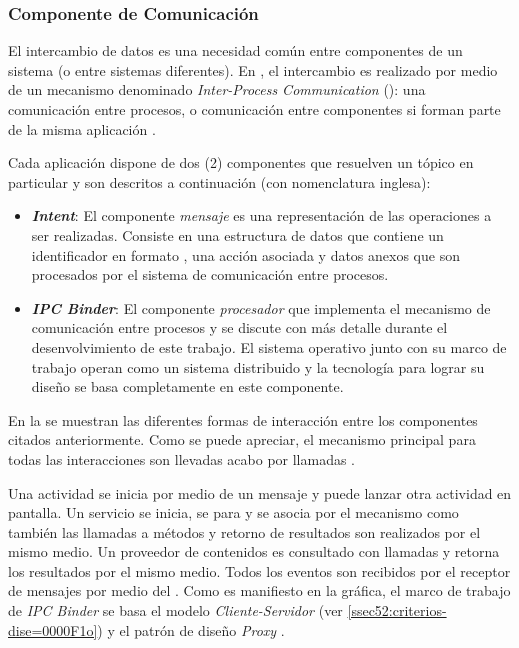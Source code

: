 \subsubsection{Componente de Comunicación}

El intercambio de datos es una necesidad común entre componentes de
un sistema (o entre sistemas diferentes). En \emph{},
el intercambio es realizado por medio de un mecanismo denominado \emph{Inter-Process
Communication} (): una comunicación entre procesos, o comunicación
entre componentes si forman parte de la misma aplicación \cite{Schreiber2011}. 

Cada aplicación dispone de dos (2) componentes que resuelven un tópico
en particular y son descritos a continuación (con nomenclatura inglesa):
\begin{itemize}
\item \textbf{\emph{Intent}}: El componente \emph{mensaje} es una representación
de las operaciones a ser realizadas. Consiste en una estructura de
datos que contiene un identificador en formato , una acción
asociada y datos anexos que son procesados por el sistema de comunicación
entre procesos. 
\item \textbf{\emph{IPC Binder}}: El componente \emph{procesador} que implementa
el mecanismo de comunicación entre procesos \emph{\cite{Schreiber2011}}
y se discute con más detalle durante el desenvolvimiento de este trabajo\emph{.
}El sistema operativo  junto con su marco de trabajo
operan como un sistema distribuido y la tecnología para lograr su
diseño se basa completamente en este componente.
\end{itemize}
En la  se muestran las diferentes formas
de interacción entre los componentes \emph{ }citados
anteriormente. Como se puede apreciar, el mecanismo principal para
todas las interacciones son llevadas acabo por llamadas .

Una actividad se inicia por medio de un mensaje y puede lanzar otra
actividad en pantalla. Un servicio se inicia, se para y se asocia
por el mecanismo  como también las llamadas a métodos y
retorno de resultados son realizados por el mismo medio. Un proveedor
de contenidos es consultado con llamadas  y retorna los
resultados por el mismo medio. Todos los eventos son recibidos por
el receptor de mensajes por medio del . Como es manifiesto
en la gráfica, el marco de trabajo de \emph{IPC Binder} se basa el
modelo \emph{Cliente-Servidor} (ver \ref{ssec52:criterios-dise=0000F1o})
y el patrón de diseño \emph{Proxy} \cite{Shalloway2004}.

